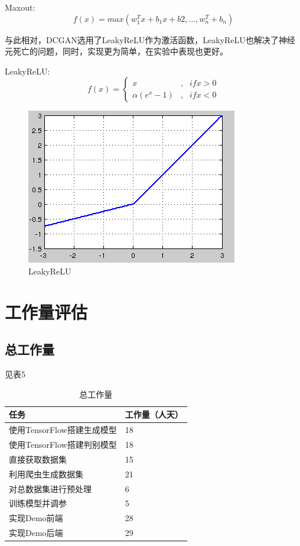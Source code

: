 \documentclass[hyperref, a4paper]{ctexart}
\begin{document}
Maxout:\[f(x)=max(w^T_1x +b_1x+b2,…,w_n^T+b_n)\]

与此相对，DCGAN选用了LeakyReLU作为激活函数，LeakyReLU也解决了神经元死亡的问题，同时，实现更为简单，在实验中表现也更好。

LeakyReLU:\[ f(x)=\left\{
\begin{aligned}
x & ,& if x>0 \\
\alpha(e^x-1) & , & if x < 0 
\end{aligned}
\right.
\]

\begin{figure}
\centering
\includegraphics{./18.jpg}
\caption{LeakyReLU}
\end{figure}

\hypertarget{ux5de5ux4f5cux91cfux8bc4ux4f30}{%
\section{工作量评估}\label{ux5de5ux4f5cux91cfux8bc4ux4f30}}

\hypertarget{ux603bux5de5ux4f5cux91cf}{%
\subsection{总工作量}\label{ux603bux5de5ux4f5cux91cf}}

见表5

\begin{table}
    \caption{总工作量}
    \centering
    \begin{tabular}{|p{4.5cm}<{\centering}|p{2.0cm}<{\centering}|}
    \hline
    任务               & 工作量（人天） \\ \hline
    使用TensorFlow搭建生成模型 & 18       \\ \hline
    使用TensorFlow搭建判别模型 & 18       \\ \hline
    直接获取数据集         & 15       \\ \hline
    利用爬虫生成数据集         & 21       \\ \hline
    对总数据集进行预处理         & 6       \\ \hline
    训练模型并调参         & 5       \\ \hline
    实现Demo前端           & 28      \\ \hline
    实现Demo后端         & 29       \\ \hline
    \end{tabular}
\end{table}
\end{document}
